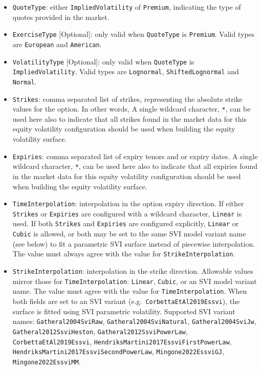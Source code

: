 \begin{itemize}
\item
\lstinline!QuoteType!: either \lstinline!ImpliedVolatility! of \lstinline!Premium!, indicating the type of quotes provided in the market.

\item
\lstinline!ExerciseType! [Optional]: only valid when \lstinline!QuoteType! is \lstinline!Premium!. Valid types are \lstinline!European! and \lstinline!American!.

\item
\lstinline!VolatilityType! [Optional]: only valid when \lstinline!QuoteType! is \lstinline!ImpliedVolatility!. Valid types are \lstinline!Lognormal!, \lstinline!ShiftedLognormal! and \lstinline!Normal!.

\item
\lstinline!Strikes!: comma separated list of strikes, representing the absolute strike values for the option. In other words, A single wildcard character, \lstinline!*!, can be used here also to indicate that all strikes found in the market data for this equity volatility configuration should be used when building the equity volatility surface.

\item
\lstinline!Expiries!: comma separated list of expiry tenors and or expiry dates. A single wildcard character, \lstinline!*!, can be used here also to indicate that all expiries found in the market data for this equity volatility configuration should be used when building the equity volatility surface.

\item
\lstinline!TimeInterpolation!: interpolation in the option expiry direction. If either \lstinline!Strikes! or \lstinline!Expiries! are configured with a wildcard character, \lstinline!Linear! is used. If both \lstinline!Strikes! and \lstinline!Expiries! are configured explicitly, \lstinline!Linear! or \lstinline!Cubic! is allowed, or both may be set to the same SVI model variant name (see below) to fit a parametric SVI surface instead of piecewise interpolation. The value must always agree with the value for \lstinline!StrikeInterpolation!.

\item
\lstinline!StrikeInterpolation!: interpolation in the strike direction. Allowable values mirror those for \lstinline!TimeInterpolation!: \lstinline!Linear!, \lstinline!Cubic!, or an SVI model variant name. The value must agree with the value for \lstinline!TimeInterpolation!. When both fields are set to an SVI variant (e.g.\ \lstinline!CorbettaEtAl2019Essvi!), the surface is fitted using SVI parametric volatility. Supported SVI variant names: \lstinline!Gatheral2004SviRaw!, \lstinline!Gatheral2004SviNatural!, \lstinline!Gatheral2004SviJw!, \lstinline!Gatheral2012SsviHeston!, \lstinline!Gatheral2012SsviPowerLaw!, \lstinline!CorbettaEtAl2019Essvi!, \lstinline!HendriksMartini2017EssviFirstPowerLaw!, \lstinline!HendriksMartini2017EssviSecondPowerLaw!, \lstinline!Mingone2022EssviGJ!, \lstinline!Mingone2022EssviMM!.


\end{itemize}
